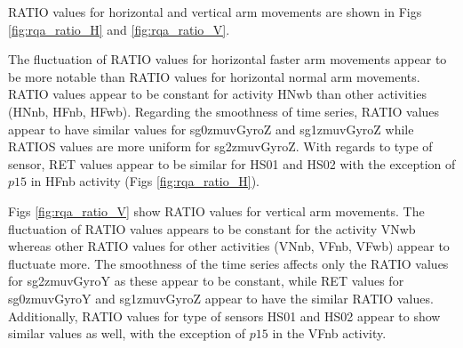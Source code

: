 RATIO values for horizontal and 
vertical arm movements are shown in Figs \ref{fig:rqa_ratio_H} and 
\ref{fig:rqa_ratio_V}.

The fluctuation of RATIO values for horizontal faster arm movements 
appear to be more notable than RATIO values for horizontal normal arm 
movements. RATIO values appear to be constant for activity HNwb than
other activities (HNnb, HFnb, HFwb).
Regarding the smoothness of time series, RATIO values appear to have 
similar values for sg0zmuvGyroZ and sg1zmuvGyroZ while RATIOS values 
are more uniform for sg2zmuvGyroZ.
With regards to type of sensor, 
RET values appear to be similar for HS01 and HS02 with the exception of
$p15$ in HFnb activity (Figs \ref{fig:rqa_ratio_H}).

Figs \ref{fig:rqa_ratio_V} show RATIO values for vertical arm movements.
The fluctuation of RATIO values appears to be constant for the activity 
VNwb whereas other RATIO values for other activities (VNnb, VFnb, VFwb) 
appear to fluctuate more.
The smoothness of the time series affects only the RATIO values for 
sg2zmuvGyroY as these appear to be constant, while RET values for 
sg0zmuvGyroY and sg1zmuvGyroZ appear to have the similar RATIO values.
Additionally, RATIO values for type of sensors HS01 and HS02 appear 
to show similar values as well, with the exception of $p15$ in the 
VFnb activity.




